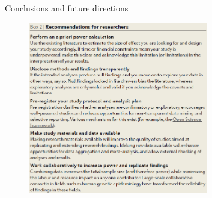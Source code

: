 \documentclass{beamer}
\begin{document}
%			
%			
%			
%			
%			
%			
%			
	
	\begin{frame}{Conclusions and future directions}		
		\begin{figure}[H]
			\centering
			\includegraphics[width=0.7\textwidth]{pics/recommend for researcher.png}
		\end{figure}
	\end{frame}
	
\end{document}
